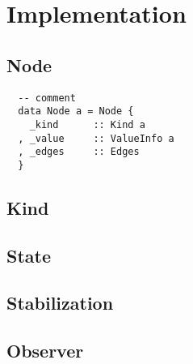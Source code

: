 \documentclass[a4paper, twocolumn]{article}
\begin{document}
\section{Implementation}
\subsection{Node}
\begin{lstlisting}
  -- comment
  data Node a = Node {
    _kind      :: Kind a
  , _value     :: ValueInfo a
  , _edges     :: Edges
  }  
\end{lstlisting}

\subsection{Kind}

\subsection{State}

\subsection{Stabilization}

\subsection{Observer}






\end{document}
